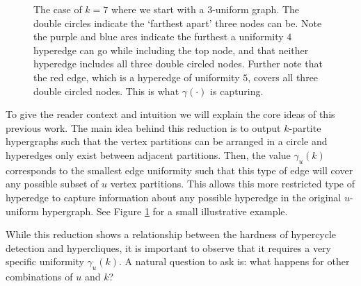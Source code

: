 \documentclass[11pt,letterpaper,pdftex]{article}
\begin{document}
\begin{figure}[ht]
    \centering

    \caption{The case of $k=7$ where we start with a $3$-uniform graph. The double circles indicate the `farthest apart' three nodes can be. Note the purple and blue arcs indicate the furthest a uniformity $4$ hyperedge can go while including the top node, and that neither hyperedge includes all three double circled nodes. Further note that the red edge, which is a hyperedge of uniformity $5$, covers all three double circled nodes. This is what $\gamma(\cdot)$ is capturing. }
    \label{fig:smallExampleGamma}
\end{figure}

To give the reader context and intuition we will explain the core ideas of this previous work. The main idea behind this reduction is to output $k$-partite hypergraphs such that the vertex partitions can be arranged in a circle and hyperedges only exist between adjacent partitions.
Then, the value $\gamma_u(k)$ corresponds to the smallest edge uniformity such that this type of edge will cover any possible subset of $u$ vertex partitions.
This allows this more restricted type of hyperedge to capture information about any possible hyperedge in the original $u$-uniform hypergraph. See Figure \ref{fig:smallExampleGamma} for a small illustrative example. 


 
While this reduction shows a relationship between the hardness of hypercycle detection and hypercliques, it is important to observe that it requires a very specific uniformity $\gamma_u(k)$.
A natural question to ask is: what happens for other combinations of $u$ and $k$?
\end{document}
